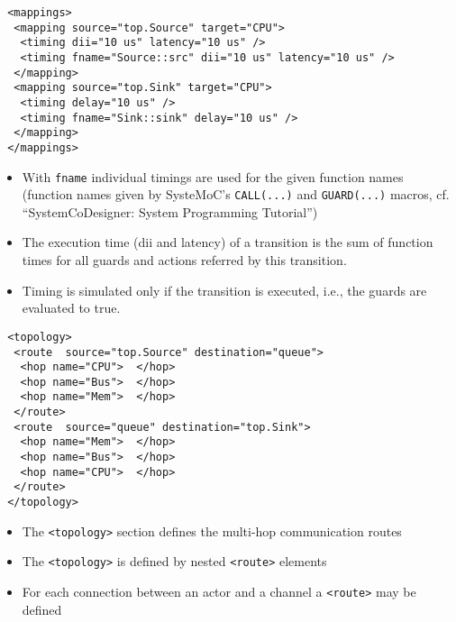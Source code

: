 \begin{frame}[fragile=singleslide]
\begin{lstlisting}
 <mappings>
  <mapping source="top.Source" target="CPU">
   <timing dii="10 us" latency="10 us" />
   <timing fname="Source::src" dii="10 us" latency="10 us" />
  </mapping>
  <mapping source="top.Sink" target="CPU">
   <timing delay="10 us" />
   <timing fname="Sink::sink" delay="10 us" />
  </mapping>
 </mappings>
\end{lstlisting}
\begin{itemize}
\item With \lstinline!fname! individual timings are used for the given function names (function names given by SysteMoC's \lstinline!CALL(...)! and \lstinline!GUARD(...)! macros, cf. ``SystemCoDesigner: System Programming Tutorial'')
\item The execution time (dii and latency) of a transition is the sum of function times for all guards and actions referred by this transition.
\item Timing is simulated only if the transition is executed, i.e., the guards are evaluated to true.
\end{itemize}
\vfill
\end{frame}


\begin{frame}[fragile=singleslide]
\begin{lstlisting}
 <topology>
  <route  source="top.Source" destination="queue">
   <hop name="CPU">  </hop>
   <hop name="Bus">  </hop>
   <hop name="Mem">  </hop>
  </route>
  <route  source="queue" destination="top.Sink">
   <hop name="Mem">  </hop>
   <hop name="Bus">  </hop>
   <hop name="CPU">  </hop>
  </route>
 </topology>
\end{lstlisting}
\begin{itemize}
\item The  \lstinline!<topology>! section defines the multi-hop communication routes
\item The \lstinline!<topology>! is defined by nested \lstinline!<route>! elements
\item For each connection between an actor and a channel a  \lstinline!<route>! may be defined
\end{itemize}
\end{frame}


